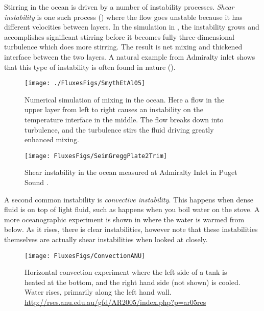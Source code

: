 Stirring in the ocean is driven by a number of instability processes.  \emph{Shear instability} is one such process () where the flow goes unstable because it has different velocities between layers.  In the simulation in , the instability grows and accomplishes significant stirring before it becomes fully three-dimensional turbulence which does more stirring.  The result is net mixing and thickened interface between the two layers.  A natural example from Admiralty inlet shows that this type of instability is often found in nature ().  

\begin{figure}[hbt]
  \begin{center}
    \texttt{[image: ./FluxesFigs/SmythEtAl05]}
    \caption{Numerical simulation of mixing in the ocean.  Here a flow in the upper layer from left to right causes an instability on the temperature interface in the middle.  The flow breaks down into turbulence, and the turbulence stirs the fluid driving greatly enhanced mixing. \citep{smythetal05}}
    \label{fig:Smythetal05}  
  \end{center}
\end{figure}


\begin{figure}[hbt]
  \begin{center}
    \texttt{[image: FluxesFigs/SeimGreggPlate2Trim]}
    \caption{Shear instability in the ocean measured at Admiralty Inlet in Puget Sound \citep{seimgregg94}. }
    \label{fig:SeimGreggPlate2Trim}  
  \end{center}
\end{figure}

A second common instability is \emph{convective instability}.  This happens when dense fluid is on top of light fluid, such as happens when you boil water on the stove.  A more oceanographic experiment is shown in  where the water is warmed from below.  As it rises, there is clear instabilities, however note that these instabilities themselves are actually shear instabilities when looked at closely.  

\begin{figure}[hbt]
  \begin{center}
    \texttt{[image: FluxesFigs/ConvectionANU]}
    \caption{Horizontal convection experiment where the left side of a tank is heated at the bottom, and the right hand side (not shown) is cooled.  Water rises, primarily along the left hand wall.  \url{http://rses.anu.edu.au/gfd/AR2005/index.php?p=ar05res}}
    \label{fig:ConvectionANU}
  \end{center}
\end{figure}

